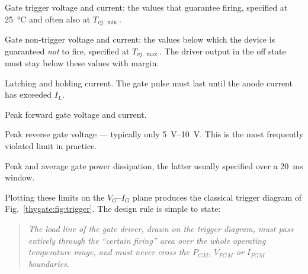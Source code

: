 \begin{description}[style=nextline,leftmargin=2.2cm,labelwidth=2cm]
  \item[$V_{GT}$, $I_{GT}$] Gate trigger voltage and current: the values that
        guarantee firing, specified at \SI{25}{\celsius} and often also at
        $T_{vj,\min}$.
  \item[$V_{GD}$, $I_{GD}$] Gate non-trigger voltage and current: the values below
        which the device is guaranteed \emph{not} to fire, specified at
        $T_{vj,\max}$. The driver output in the off state must stay below these
        values with margin.
  \item[$I_L$, $I_H$] Latching and holding current. The gate pulse must last until
        the anode current has exceeded $I_L$.
  \item[$V_{FGM}$, $I_{FGM}$] Peak forward gate voltage and current.
  \item[$V_{RGM}$] Peak reverse gate voltage --- typically only
        \SIrange{5}{10}{\volt}. This is the most frequently violated limit in
        practice.
  \item[$P_{GM}$, $P_{G(AV)}$] Peak and average gate power dissipation, the latter
        usually specified over a \SI{20}{\milli\second} window.
\end{description}

Plotting these limits on the $V_G$--$I_G$ plane produces the classical trigger
diagram of Fig.~\ref{thygate:fig:trigger}. The design rule is simple to state:

\begin{quote}
\emph{The load line of the gate driver, drawn on the trigger diagram, must pass
entirely through the ``certain firing'' area over the whole operating temperature
range, and must never cross the $P_{GM}$, $V_{FGM}$ or $I_{FGM}$ boundaries.}
\end{quote}


